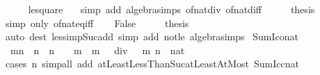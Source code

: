\begin{isabellebody}
\ \ \ \ \isamarkupfalse%
\ le{\isacharunderscore}{\kern0pt}square\ {\isacharasterisk}{\kern0pt}\ \isamarkupfalse%
\ {\isacharparenleft}{\kern0pt}simp\ add{\isacharcolon}{\kern0pt}\ algebra{\isacharunderscore}{\kern0pt}simps\ of{\isacharunderscore}{\kern0pt}nat{\isacharunderscore}{\kern0pt}div\ of{\isacharunderscore}{\kern0pt}nat{\isacharunderscore}{\kern0pt}diff{\isacharparenright}{\kern0pt}\isanewline
\ \ \isamarkupfalse%
\ \isamarkupfalse%
\ {\isacharquery}{\kern0pt}thesis\isanewline
\ \ \ \ \isamarkupfalse%
\ {\isacharparenleft}{\kern0pt}simp\ only{\isacharcolon}{\kern0pt}\ of{\isacharunderscore}{\kern0pt}nat{\isacharunderscore}{\kern0pt}eq{\isacharunderscore}{\kern0pt}iff{\isacharparenright}{\kern0pt}\isanewline
{}\isamarkupfalse%
\isanewline
\ \ \isamarkupfalse%
\ False\isanewline
\ \ \isamarkupfalse%
\ \isamarkupfalse%
\ {\isacharquery}{\kern0pt}thesis\isanewline
\ \ \ \ \isamarkupfalse%
\ {\isacharparenleft}{\kern0pt}auto\ dest{\isacharcolon}{\kern0pt}\ less{\isacharunderscore}{\kern0pt}imp{\isacharunderscore}{\kern0pt}Suc{\isacharunderscore}{\kern0pt}add\ simp\ add{\isacharcolon}{\kern0pt}\ not{\isacharunderscore}{\kern0pt}le\ algebra{\isacharunderscore}{\kern0pt}simps{\isacharparenright}{\kern0pt}\isanewline
{}\isamarkupfalse%
%
\endisatagproof
{\isafoldproof}%
%
\isadelimproof
\isanewline
%
\endisadelimproof
\isanewline
{}\isamarkupfalse%
\ Sum{\isacharunderscore}{\kern0pt}Ico{\isacharunderscore}{\kern0pt}nat{\isacharcolon}{\kern0pt}\ \isanewline
\ \ {\isachardoublequoteopen}{\isasymSum}{\isacharbraceleft}{\kern0pt}m{\isachardot}{\kern0pt}{\isachardot}{\kern0pt}{\isacharless}{\kern0pt}n{\isacharbraceright}{\kern0pt}\ {\isacharequal}{\kern0pt}\ {\isacharparenleft}{\kern0pt}n\ {\isacharasterisk}{\kern0pt}\ {\isacharparenleft}{\kern0pt}n\ {\isacharminus}{\kern0pt}\ {}{\isacharparenright}{\kern0pt}\ {\isacharminus}{\kern0pt}\ m\ {\isacharasterisk}{\kern0pt}\ {\isacharparenleft}{\kern0pt}m\ {\isacharminus}{\kern0pt}\ {}{\isacharparenright}{\kern0pt}{\isacharparenright}{\kern0pt}\ div\ {}{\isachardoublequoteclose}\ \ m\ n\ {\isacharcolon}{\kern0pt}{\isacharcolon}{\kern0pt}\ nat\isanewline
%
\isadelimproof
\ \ %
\endisadelimproof
%
\isatagproof
{}\isamarkupfalse%
\ {\isacharparenleft}{\kern0pt}cases\ n{\isacharparenright}{\kern0pt}\ {\isacharparenleft}{\kern0pt}simp{\isacharunderscore}{\kern0pt}all\ add{\isacharcolon}{\kern0pt}\ atLeastLessThanSuc{\isacharunderscore}{\kern0pt}atLeastAtMost\ Sum{\isacharunderscore}{\kern0pt}Icc{\isacharunderscore}{\kern0pt}nat{\isacharparenright}{\kern0pt}%

\end{isabellebody}
